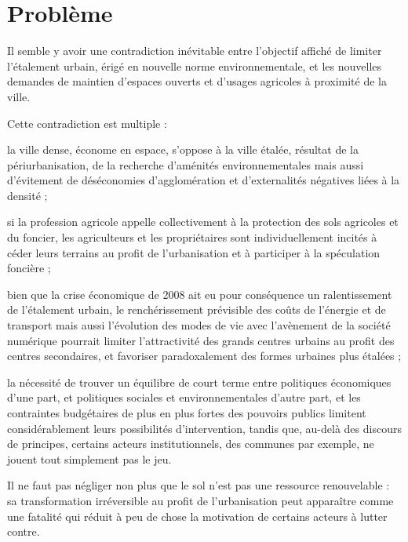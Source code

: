 \section[probleme]{Problème}

Il semble y avoir une contradiction inévitable entre l'objectif affiché de limiter
l'étalement urbain, érigé en nouvelle norme environnementale,
et les nouvelles demandes de maintien d'espaces ouverts
et d'usages agricoles à proximité de la ville.

Cette contradiction est multiple :

\startitemize[a]

\item la ville dense, économe en espace, s'oppose à la ville étalée,
	résultat de la périurbanisation, de la recherche d'aménités environnementales
	mais aussi d'évitement de déséconomies d'agglomération et d'externalités négatives
	liées à la densité ;

\item si la profession agricole appelle collectivement à la protection des sols agricoles
	et du foncier, les agriculteurs et les propriétaires sont individuellement
	incités à céder leurs terrains au profit de l'urbanisation et
	à participer à la spéculation foncière ;

\item bien que la crise économique de 2008 ait eu pour conséquence
	un ralentissement de l'étalement urbain,
	le renchérissement prévisible des coûts de l'énergie et de transport
	mais aussi l'évolution des modes de vie avec l'avènement de la société numérique
	pourrait limiter l'attractivité des grands centres urbains
	au profit des centres secondaires, et favoriser paradoxalement des formes urbaines
	plus étalées ;

\item la nécessité de trouver un équilibre de court terme entre politiques économiques
	d'une part, et politiques sociales et environnementales d'autre part, et les contraintes budgétaires de plus en plus fortes des pouvoirs publics
	limitent considérablement leurs possibilités d'intervention, tandis que,
	au-delà des discours de principes,
	certains acteurs institutionnels, des communes par exemple,
	ne jouent tout simplement pas le jeu.

\stopitemize

Il ne faut pas négliger non plus que le sol n'est pas une ressource renouvelable :
sa transformation irréversible au profit de l'urbanisation peut apparaître comme une
fatalité qui réduit à peu de chose la motivation de certains acteurs à lutter contre.

